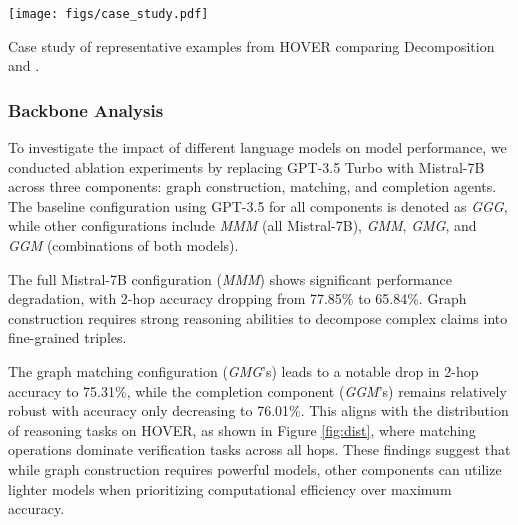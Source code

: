 \begin{table*}[!hbt]
    \centering
    \texttt{[image: figs/case\_study.pdf]}
    \caption{Case study of representative examples from HOVER comparing Decomposition and {\MyFC}. }
    \label{tab:case_study}
    \vspace{-5mm}
\end{table*}
\subsubsection{Backbone Analysis} \label{Backbone_Analysis}
To investigate the impact of different language models on model performance, we conducted ablation experiments by replacing GPT-3.5 Turbo with Mistral-7B across three components: graph construction, matching, and completion agents. The baseline configuration using GPT-3.5 for all components is denoted as \textit{GGG}, while other configurations include \textit{MMM} (all Mistral-7B), \textit{GMM}, \textit{GMG}, and \textit{GGM} (combinations of both models).

 The full Mistral-7B configuration (\textit{MMM}) shows significant performance degradation, with 2-hop accuracy dropping from 77.85\% to 65.84\%. Graph construction requires strong reasoning abilities to decompose complex claims into fine-grained triples.

 The graph matching configuration (\textit{GMG}'s) leads to a notable drop in 2-hop accuracy to 75.31\%, while the completion component (\textit{GGM}'s) remains relatively robust with accuracy only decreasing to 76.01\%. This aligns with the distribution of reasoning tasks on HOVER, as shown in Figure \ref{fig:dist}, where matching operations dominate verification tasks across all hops. These findings suggest that while graph construction requires powerful models, other components can utilize lighter models when prioritizing computational efficiency over maximum accuracy.

